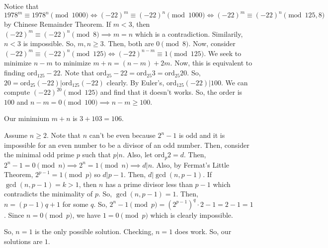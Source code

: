 \documentclass[11pt]{article}
\begin{document}
\begin{sol}
Notice that $1978^{m}\equiv 1978^{n}\pmod{1000}\iff (-22)^m \equiv (-22)^n \pmod{1000} \iff (-22)^m \equiv (-22)^n \pmod{125,8}$ by Chinese Remainder Theorem.
If $m<3$, then $(-22)^m\equiv (-22)^n\pmod{8}\implies m=n$ which is a contradiction. Similarily, $n<3$ is impossible. So, $m,n\ge3$. Then, both are $0\pmod{8}$.
Now, consider $(-22)^{m}\equiv (-22)^{n}\pmod{125}\iff (-22)^{n-m}\equiv 1\pmod{125}$. We seek to minimize $n-m$ to minimize $m+n=(n-m)+2m$. Now, this is equivalent to finding $\text{ord}_{125} -22$. Note that $\text{ord}_{25} -22 = \text{ord}_{25} 3 = \text{ord}_{25} 20$. So, $20=\text{ord}_{25}(-22) |\text{ord}_{125} (-22)$ clearly. By Euler's, $\text{ord}_{125} (-22)|100$. We can compute $(-22)^{20} \pmod{125}$ and find that it doesn't works. So, the order is $100$ and $n-m=0\pmod{100}\implies n-m\ge 100$.

Our minimium $m+n$ is $3+103=\boxed{106}$.
\end{sol}


\begin{sol}
Assume $n\ge 2$. Note that $n$ can't be even because $2^{n}-1$ is odd and it is impossible for an even number to be a divisor of an odd number. Then, consider the minimal odd prime $p$ such that $p|n$. Also, let $\text{ord}_{p} 2 =d$. Then, $2^{n}-1=0\pmod{n} \implies 2^{n}=1\pmod{n}\implies d|n$. Also, by Fermat's Little Theorem, $2^{p-1}=1\pmod{p}$ so $d|p-1$. Then, $d|\gcd(n,p-1)$. If $\gcd(n,p-1)=k>1$, then $n$ has a prime divisor less than $p-1$ which contradicts the minimality of $p$. So, $\gcd(n,p-1)=1$. Then, $n=(p-1)q+1$ for some $q$. So, $2^{n}-1\pmod{p}=(2^{p-1})^{q}\cdot 2-1=2-1=1$. Since $n=0\pmod{p}$, we have $1=0\pmod{p}$ which is clearly impossible.

So, $n=1$ is the only possible solution. Checking, $n=1$ does work. So, our solutions are $\boxed{1}$.
\end{sol}

\end{document}
